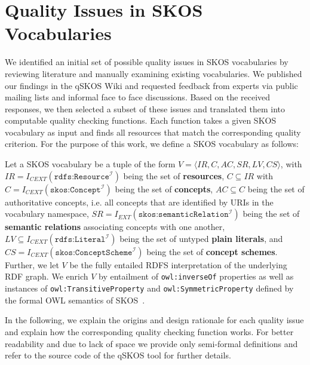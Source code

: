
\section{Quality Issues in SKOS Vocabularies}\label{sec:criteria}


We identified an initial set of possible quality issues in SKOS vocabularies by reviewing literature and manually examining existing vocabularies. We published our findings in the qSKOS Wiki and requested feedback from experts via public mailing lists and informal face to face discussions. Based on the received responses, we then selected a subset of these issues and translated them into computable quality checking functions. Each function takes a given SKOS vocabulary as input and finds all resources that match the corresponding quality criterion. For the purpose of this work, we define a SKOS vocabulary as follows:

\begin{mydef}
Let a SKOS vocabulary be a tuple of the form $V = \langle IR, C, AC, SR, LV, CS \rangle$, with \(IR = I_{CEXT}(\texttt{rdfs:Resource}^\mathcal{I})\) being the set of \textbf{resources}, \(C \subseteq IR\) with \(C = I_{CEXT}(\texttt{skos:Concept}^\mathcal{I})\) being the set of \textbf{concepts}, \(AC \subseteq C\) being the set of authoritative concepts, i.e. all concepts that are identified by URIs in the vocabulary namespace, \(SR = I_{EXT}(\texttt{skos:semanticRelation}^\mathcal{I})\) being the set of \textbf{semantic relations} associating concepts with one another, $LV \subseteq I_{CEXT}(\texttt{rdfs:Literal}^\mathcal{I})$ being the set of untyped \textbf{plain literals}, and \(CS = I_{CEXT}(\texttt{skos:ConceptScheme}^\mathcal{I})\) being the set of \textbf{concept schemes}. Further, we let $V$ be the fully entailed RDFS interpretation of the underlying RDF graph. We enrich $V$ by entailment of \texttt{owl:inverseOf} properties as well as instances of \texttt{owl:TransitiveProperty} and \texttt{owl:SymmetricProperty} defined by the formal OWL semantics of SKOS~\cite{SkosReference2008}.
\end{mydef}

In the following, we explain the origins and design rationale for each quality issue and explain how the corresponding quality checking function works. For better readability and due to lack of space we provide only semi-formal definitions and refer to the source code of the qSKOS tool for further details.

